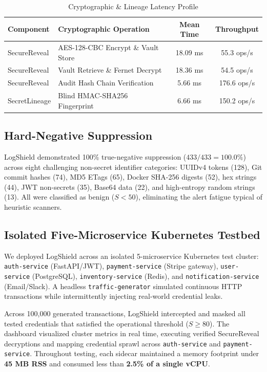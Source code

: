 \documentclass[conference]{IEEEtran}
\begin{document}
\begin{table}[t]
\caption{Cryptographic \& Lineage Latency Profile}
\label{tab:crypto_benchmarks}
\centering
\footnotesize
\setlength{\tabcolsep}{3pt}
\begin{tabularx}{\linewidth}{lXcc}
\toprule
\textbf{Component} & \textbf{Cryptographic Operation} & \textbf{Mean Time} & \textbf{Throughput} \\
\midrule
SecureReveal & AES-128-CBC Encrypt \& Vault Store & 18.09 ms & 55.3 ops/s \\
SecureReveal & Vault Retrieve \& Fernet Decrypt & 18.36 ms & 54.5 ops/s \\
SecureReveal & Audit Hash Chain Verification & 5.66 ms & 176.6 ops/s \\
SecretLineage & Blind HMAC-SHA256 Fingerprint & 6.66 ms & 150.2 ops/s \\
\bottomrule
\end{tabularx}
\end{table}

\subsection{Hard-Negative Suppression}
LogShield demonstrated 100\% true-negative suppression ($433/433 = 100.0\%$) across eight challenging non-secret identifier categories: UUIDv4 tokens (128), Git commit hashes (74), MD5 ETags (65), Docker SHA-256 digests (52), hex strings (44), JWT non-secrets (35), Base64 data (22), and high-entropy random strings (13). All were classified as benign ($S < 50$), eliminating the alert fatigue typical of heuristic scanners.

\subsection{Isolated Five-Microservice Kubernetes Testbed}
We deployed LogShield across an isolated 5-microservice Kubernetes test cluster: \texttt{auth-service} (FastAPI/JWT), \texttt{payment-service} (Stripe gateway), \texttt{user-service} (PostgreSQL), \texttt{inventory-service} (Redis), and \texttt{notification-service} (Email/Slack). A headless \texttt{traffic-generator} simulated continuous HTTP transactions while intermittently injecting real-world credential leaks. 

Across 100,000 generated transactions, LogShield intercepted and masked all tested credentials that satisfied the operational threshold ($S \ge 80$). The dashboard visualized cluster metrics in real time, executing verified SecureReveal decryptions and mapping credential sprawl across \texttt{auth-service} and \texttt{payment-service}. Throughout testing, each sidecar maintained a memory footprint under \textbf{45 MB RSS} and consumed less than \textbf{2.5\% of a single vCPU}.
\end{document}
